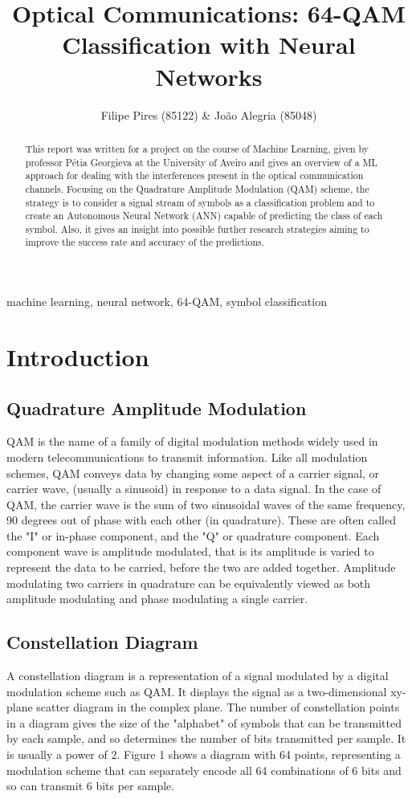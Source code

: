\documentclass[10pt]{IEEEtran}
\title{Optical Communications: 
64-QAM Classification with Neural Networks}
\author{Filipe Pires (85122) \& João Alegria (85048)}
\begin{document}
\maketitle

\begin{abstract}
This report was written for a project on the course of Machine Learning, given by professor Pétia Georgieva at the University of Aveiro and gives an overview of a ML approach for dealing with the interferences present in the optical communication channels. Focusing on the Quadrature Amplitude Modulation (QAM) scheme, the strategy is to consider a signal stream of symbols as a classification problem and to create an Autonomous Neural Network (ANN) capable of predicting the class of each symbol. Also, it gives an insight into possible further research strategies aiming to improve the success rate and accuracy of the predictions.
\end{abstract}

\begin{IEEEkeywords}
machine learning, neural network, 64-QAM, symbol classification
\end{IEEEkeywords}

\section{Introduction} %

\subsection{Quadrature Amplitude Modulation}
QAM is the name of a family of digital modulation methods widely used in modern telecommunications to transmit information. Like all modulation schemes, QAM conveys data by changing some aspect of a carrier signal, or carrier wave, (usually a sinusoid) in response to a data signal. 
In the case of QAM, the carrier wave is the sum of two sinusoidal waves of the same frequency, 90 degrees out of phase with each other (in quadrature). These are often called the "I" or in-phase component, and the "Q" or quadrature component. 
Each component wave is amplitude modulated,  that is its amplitude is varied to represent the data to be carried, before the two are added together. Amplitude modulating two carriers in quadrature can be equivalently viewed as both amplitude modulating and phase modulating a single carrier. 

\subsection{Constellation Diagram}
A constellation diagram is a representation of a signal modulated by a digital modulation scheme such as QAM. It displays the signal as a two-dimensional xy-plane scatter diagram in the complex plane. 
The number of constellation points in a diagram gives the size of the "alphabet" of symbols that can be transmitted by each sample, and so determines the number of bits transmitted per sample. It is usually a power of 2. 
Figure 1 shows a diagram with 64 points, representing a modulation scheme that can separately encode all 64 combinations of 6 bits and so can transmit 6 bits per sample.
\end{document}
